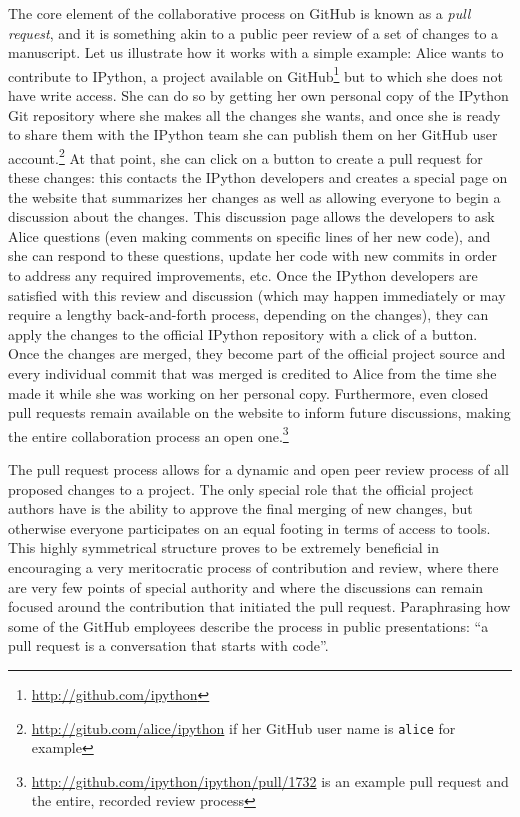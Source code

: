 \documentclass[ChapterTOCs,krantz2]{krantz} %
\begin{document}
The core element of the collaborative process on GitHub is known as a
\emph{pull request}, and it is something akin to a public peer review of a set
of changes to a manuscript.  Let us illustrate how it works with a simple
example: Alice wants to contribute to IPython, a project available on
GitHub\footnote{\url{http://github.com/ipython}} but to which she does not have
write access. She can do so by getting her own personal copy of the IPython Git
repository where she makes all the changes she wants, and once she is ready to
share them with the IPython team she can publish them on her GitHub user
account.\footnote{\url{http://gitub.com/alice/ipython} if her GitHub user name
is \texttt{alice} for example}  At that point, she can click on a button to
create a pull request for these changes: this contacts the IPython developers
and creates a special page on the website that summarizes her changes as well
as allowing everyone to begin a discussion about the changes.  This discussion
page allows the developers to ask Alice questions (even making comments on
specific lines of her new code), and she can respond to these questions, update
her code with new commits in order to address any required improvements, etc.
Once the IPython developers are satisfied with this review and discussion
(which may happen immediately or may require a lengthy back-and-forth process,
depending on the changes), they can apply the changes to the official IPython
repository with a click of a button.  Once the changes are merged, they become
part of the official project source and every individual commit that was merged
is credited to Alice from the time she made it while she was working on her
personal copy.  Furthermore, even closed pull requests remain available on the
website to inform future discussions, making the entire collaboration process
an open one.\footnote{\url{http://github.com/ipython/ipython/pull/1732} is an
example pull request and the entire, recorded review process}

The pull request process allows for a dynamic and open peer review process of
all proposed changes to a project.  The only special role that the official
project authors have is the ability to approve the final merging of new
changes, but otherwise everyone participates on an equal footing in terms of
access to tools.  This highly symmetrical structure proves to be extremely
beneficial in encouraging a very meritocratic process of contribution and
review, where there are very few points of special authority and where the
discussions can remain focused around the contribution that initiated the pull
request.  Paraphrasing how some of the GitHub employees describe the process in
public presentations: ``a pull request is a conversation that starts with
code''.
\end{document}
